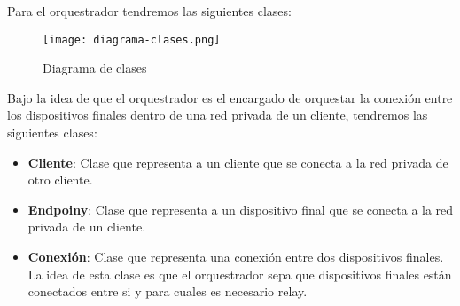 Para el orquestrador tendremos las siguientes clases:
\begin{figure}[h!]
    \centering
    \texttt{[image: diagrama-clases.png]}
    \caption{Diagrama de clases}
\end{figure}

Bajo la idea de que el orquestrador es el encargado de orquestar la conexión entre los dispositivos finales dentro de una red privada de un cliente, tendremos las siguientes clases:
\begin{itemize}
    \item \textbf{Cliente}: Clase que representa a un cliente que se conecta a la red privada de otro cliente.
    \item \textbf{Endpoiny}: Clase que representa a un dispositivo final que se conecta a la red privada de un cliente.
    \item \textbf{Conexión}: Clase que representa una conexión entre dos dispositivos finales. La idea de esta clase es que el orquestrador sepa que dispositivos finales están conectados entre si y para cuales es necesario relay.
\end{itemize}